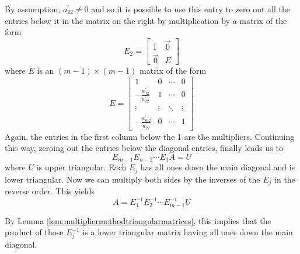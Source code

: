 \documentclass{ximera}
\begin{document}
By assumption, $a_{22}^{\prime }\neq 0$ and so it is possible to use this
entry to zero out all the entries below it in the matrix on the right by
multiplication by a matrix of the form 
\begin{equation*}
E_{2}=
\begin{bmatrix}
1 & \vec{0} \\
\vec{0} & E
\end{bmatrix}
\end{equation*}
where $E$ is an $( m-1)\times ( m-1)$
matrix of the form
\begin{equation*}
E=\begin{bmatrix}
1 & 0 & \cdots & 0 \\
-\frac{a_{32}^{\prime }}{a_{22}^{\prime }} & 1 & \cdots & 0 \\
\vdots & \vdots & \ddots & \vdots \\
-\frac{a_{m2}^{\prime }}{a_{22}^{\prime }} & 0 & \cdots & 1
\end{bmatrix}
\end{equation*}
Again, the entries in the first column below the 1 are the multipliers.
Continuing this way, zeroing out the entries below the diagonal entries, finally leads us to
\begin{equation*}
E_{m-1}E_{n-2}\cdots E_{1}A=U
\end{equation*}
where $U$ is upper triangular. Each $E_{j}$ has all ones down the main diagonal and is lower triangular. Now we can multiply both sides by the inverses of the $E_{j}$ in the reverse order. This yields
\begin{equation*}
A=E_{1}^{-1}E_{2}^{-1}\cdots E_{m-1}^{-1}U
\end{equation*}

By Lemma \ref{lem:multipliermethodtriangularmatrices}, this implies that the product of those $E_{j}^{-1}$
is a lower triangular matrix having all ones down the main diagonal.
\end{document}
